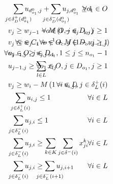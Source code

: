 \documentclass{article}
\begin{document}
\begin{alignat}{3}
    \label{mod:c15}        & \hspace{2mm} \smashoperator{ \sum_{ j \in \delta^{+}_{D}(d^0_{o_1})}}{u_{d^0_{o_1},j } } +\smashoperator{ \sum_{ j \in \delta^{-}_{D}(d^0_{o_1})}}{u_{j,d^0_{o_1} } } \geq 1    & \hspace{-20mm} \forall o_1 \in O \text{ }    \\
    \label{mod:c16}        & v_{j} \geq w_{j-1} - M\left(1- u_{j-1,j}\right)   & \hspace{-40mm}  \forall o \in O, j \in D_{o}, j \geq 1  \text{ }    \\
    \label{mod:c17}        & v_{j}  \leq  w_{j-1} + \gamma^1 + M\left(1- u_{j-1,j}\right)    & \hspace{-50mm} \forall c \in C, \forall o \in O_c, j \in D_{o}, j \geq 1 \text{ }     \\
    \label{mod:c18}        & u_{j-1,j} \geq u_{j,j+1}      & \hspace{-60mm} \forall o_1 \in O,  j \in D_{o_1}, 1 \leq j \leq n_{o_{1}}-1 \text{ }   \\
    \label{mod:c19}        & u_{j-1,j} \geq \sum_{l \in L}{x_{lj}}   & \hspace{-40mm}  \forall o_1 \in O, j \in D_{o_1}, j \geq 1 \text{ }                   \\
    \label{mod:c20}        & v_{j} \geq w_{i} - M\left(1- u_{i,j}\right)   & \hspace{-40mm}  \forall i \in L, j \in \delta^{+}_{L}(i) \text{ }  \\
    \label{mod:c21}        & \hspace{3mm} \smashoperator{ \sum_{ j \in \delta^{+}_{L}(i)}}{u_{i,j } } \leq 1     & \hspace{-40mm}  \forall i \in L \text{ }         \\
    \label{mod:c22}        & \hspace{2mm} \smashoperator{ \sum_{ j \in \delta^{-}_{L}(i)}}{u_{j,i } } \leq 1                                      & \hspace{-40mm} \forall i \in L           \text{ }       \\
    \label{mod:c230}       & \hspace{2mm} \smashoperator{ \sum_{ j \in \delta^{-}_{L}(i)}}{u_{j,i } }  \geq \sum_{k \in K}\sum_{j \in  \delta^{-}(i) }{x^k_{ji}}    & \hspace{-40mm} \forall i \in L \text{ }                                                      \\
    \label{mod:c231}       & \hspace{2mm} \smashoperator{ \sum_{ j \in \delta^{-}_{L}(i)}}{u_{j,i } } \geq \smashoperator{ \sum_{ j \in \delta^{-}_{L}(i+1)}}{u_{j,i+1 } }   & \hspace{-20mm} \forall i \in L  \text{ }                                                        \\

\end{alignat}
\end{document}
